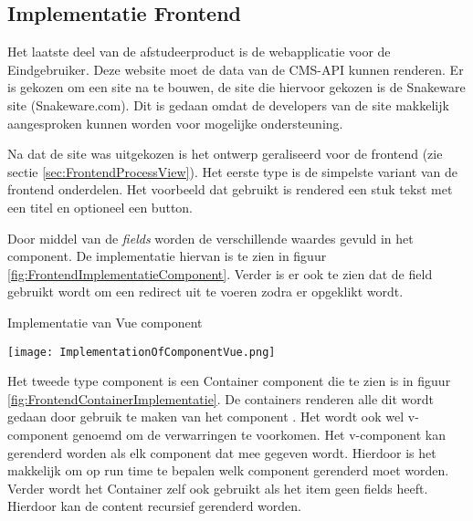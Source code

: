 \subsection{Implementatie Frontend}
Het laatste deel van de afstudeerproduct is de webapplicatie voor de \gls{Eindgebruiker}.
Deze website moet de data van de CMS-API kunnen renderen.
Er is gekozen om een site na te bouwen, de site die hiervoor gekozen is de Snakeware site (Snakeware.com).
Dit is gedaan omdat de developers van de site makkelijk aangesproken kunnen worden voor mogelijke ondersteuning.

\whitespace
Na dat de site was uitgekozen is het ontwerp geraliseerd voor de frontend (zie sectie \ref{sec:FrontendProcessView}).
Het eerste type is de simpelste variant van de frontend onderdelen. 
Het voorbeeld dat gebruikt is rendered een stuk tekst met een titel en optioneel een button.

\whitespace
Door middel van de \textit{fields} worden de verschillende waardes gevuld in het component.
%
De implementatie hiervan is te zien in figuur \ref{fig:FrontendImplementatieComponent}.
Verder is er ook te zien dat de  field gebruikt wordt om  een redirect uit te voeren zodra er opgeklikt wordt.

\whitespace
\begin{graphic}
    \captionsetup{type=figure}
    \caption{Implementatie van Vue component}
    \texttt{[image: ImplementationOfComponentVue.png]}
    \label{fig:FrontendImplementatieComponent}
\end{graphic}

\whitespace
Het tweede type component is een Container component die te zien is in figuur \ref{fig:FrontendContainerImplementatie}.
De containers renderen alle  dit wordt gedaan door gebruik te maken van het component .
Het  wordt ook wel v-component genoemd om de verwarringen te voorkomen.
Het v-component kan gerenderd worden als elk component dat mee gegeven wordt.
Hierdoor is het makkelijk om op run time te bepalen welk component gerenderd moet worden.
Verder wordt het Container zelf ook gebruikt als het item geen fields heeft.
Hierdoor kan de content recursief gerenderd worden.

